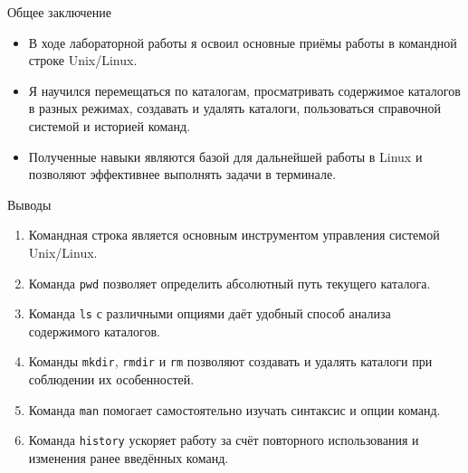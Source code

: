 \documentclass[
  ignorenonframetext,
  aspectratio=169,
  russian,
  aspectratio=169]{beamer}
\providecommand{\tightlist}{%
  \setlength{\itemsep}{0pt}\setlength{\parskip}{0pt}}
\begin{document}
\begin{frame}{Общее заключение}
\protect{}\label{ux43eux431ux449ux435ux435-ux437ux430ux43aux43bux44eux447ux435ux43dux438ux435}
\begin{itemize}[<+->]
\tightlist
\item
  В ходе лабораторной работы я освоил основные приёмы работы в командной
  строке Unix/Linux.
\item
  Я научился перемещаться по каталогам, просматривать содержимое
  каталогов в разных режимах, создавать и удалять каталоги, пользоваться
  справочной системой и историей команд.
\item
  Полученные навыки являются базой для дальнейшей работы в Linux и
  позволяют эффективнее выполнять задачи в терминале.
\end{itemize}
\end{frame}

\begin{frame}[fragile]{Выводы}
\protect{}\label{ux432ux44bux432ux43eux434ux44b-1}
\begin{enumerate}[<+->]
\tightlist
\item
  Командная строка является основным инструментом управления системой
  Unix/Linux.
\item
  Команда \texttt{pwd} позволяет определить абсолютный путь текущего
  каталога.
\item
  Команда \texttt{ls} с различными опциями даёт удобный способ анализа
  содержимого каталогов.
\item
  Команды \texttt{mkdir}, \texttt{rmdir} и \texttt{rm} позволяют
  создавать и удалять каталоги при соблюдении их особенностей.
\item
  Команда \texttt{man} помогает самостоятельно изучать синтаксис и опции
  команд.
\item
  Команда \texttt{history} ускоряет работу за счёт повторного
  использования и изменения ранее введённых команд.
\end{enumerate}
\end{frame}
\end{document}
